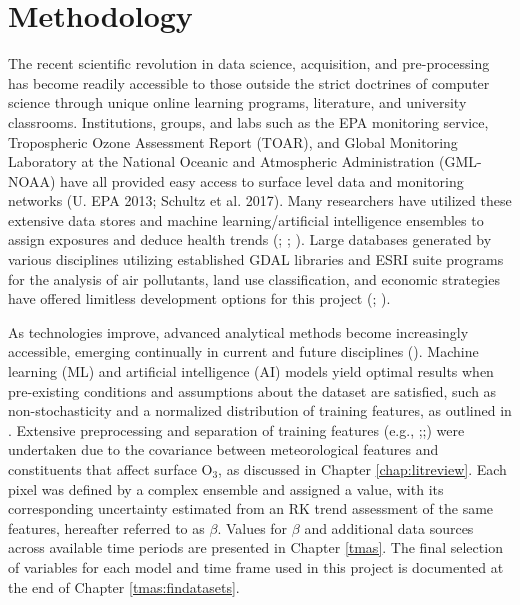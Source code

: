 \chapter{Methodology} \label{chap:methods} The recent scientific revolution in data science, acquisition, and pre-processing has become readily accessible to those outside the strict doctrines of computer science through unique online learning programs, literature, and university classrooms. Institutions, groups, and labs such as the EPA monitoring service, Tropospheric Ozone Assessment Report (TOAR), and Global Monitoring Laboratory at the National Oceanic and Atmospheric Administration (GML-NOAA) have all provided easy access to surface level data and monitoring networks (U. EPA 2013; Schultz et al. 2017). Many researchers have utilized these extensive data stores and machine learning/artificial intelligence ensembles to assign exposures and deduce health trends (\cite{abdullah_development_2019}; \cite{chen_association_2023}; \cite{xue_hourly_2022}). Large databases generated by various disciplines utilizing established GDAL libraries and ESRI suite programs for the analysis of air pollutants, land use classification, and economic strategies have offered limitless development options for this project (\cite{rouault_gdal_2025}; \cite{dangermond_building_2020}). 

As technologies improve, advanced analytical methods become increasingly accessible, emerging continually in current and future disciplines (\cite{miller_data-driven_2015}). Machine learning (ML) and artificial intelligence (AI) models yield optimal results when pre-existing conditions and assumptions about the dataset are satisfied, such as non-stochasticity and a normalized distribution of training features, as outlined in \textcite{keller_machine_2017}. Extensive preprocessing and separation of training features (e.g., \cite{ilic_assessment_2020};\cite{napi_development_2021};\cite{staehle_quantifying_2022}) were undertaken due to the covariance between meteorological features and constituents that affect surface O$_3$, as discussed in Chapter \ref{chap:litreview}. Each pixel was defined by a complex ensemble and assigned a value, with its corresponding uncertainty estimated from an RK trend assessment of the same features, hereafter referred to as $\beta$. Values for $\beta$ and additional data sources across available time periods are presented in Chapter \ref{tmas}. The final selection of variables for each model and time frame used in this project is documented at the end of Chapter \ref{tmas:findatasets}.

